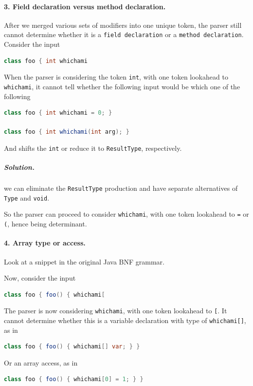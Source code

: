 \documentclass[12pt]{article}
\begin{document}
\paragraph{3. Field declaration versus method declaration.}
After we merged various sets of modifiers into one unique token, the parser still cannot determine whether it is a \texttt{field declaration} or a \texttt{method declaration}. Consider the input

\begin{lstlisting}[language=Java]
class foo { int whichami
\end{lstlisting}
When the parser is considering the token \texttt{int}, with one token lookahead to \texttt{whichami}, it cannot tell whether the following input would be which one of the following
\begin{lstlisting}[language=Java]
class foo { int whichami = 0; }

class foo { int whichami(int arg); }
\end{lstlisting}
And shifts the \texttt{int} or reduce it to \texttt{ResultType}, respectively.

\subparagraph{Solution.} we can eliminate the \texttt{ResultType} production and have separate alternatives of \texttt{Type} and \texttt{void}.



So the parser can proceed to consider \texttt{whichami}, with one token lookahead to \texttt{=} or \texttt{(}, hence being determinant.

\paragraph{4. Array type or access.}
Look at a snippet in the original Java BNF grammar.

Now, consider the input
\begin{lstlisting}[language=Java]
class foo { foo() { whichami[
\end{lstlisting}
The parser is now considering \texttt{whichami}, with one token lookahead to \texttt{[}. It cannot determine whether this is a variable declaration with type of \texttt{whichami[]}, as in
\begin{lstlisting}[language=Java]
class foo { foo() { whichami[] var; } }
\end{lstlisting}
Or an array access, as in
\begin{lstlisting}[language=Java]
class foo { foo() { whichami[0] = 1; } }
\end{lstlisting}
\end{document}
